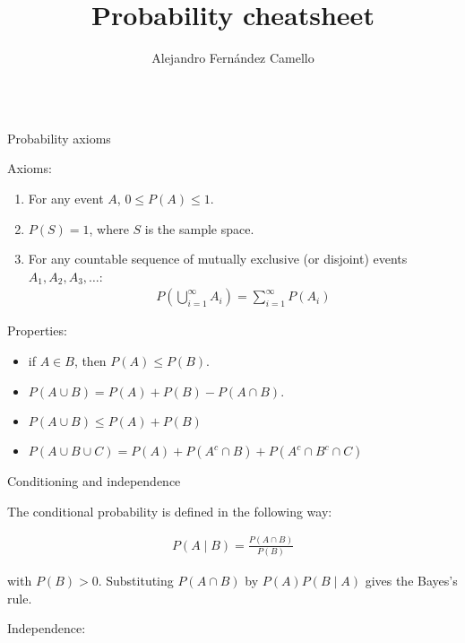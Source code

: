 \documentclass{beamer}
\title{Probability cheatsheet}
\author{Alejandro Fernández Camello}
\date{}
\begin{document}
\begin{frame}

\maketitle

\begin{columns}

\begin{column}{0.3\textwidth}
\begin{block}{Probability axioms}

Axioms:

\begin{enumerate}
    \item For any event $A$, $0 \leq P(A) \leq 1$.
    \item $P(S) = 1$, where $S$ is the sample space.
    \item For any countable sequence of mutually exclusive (or disjoint) events $A_1, A_2, A_3, \ldots$:
    \begin{align*}
        P\left( \bigcup_{i=1}^{\infty} A_i \right) = \sum_{i=1}^{\infty} P(A_i)
    \end{align*}
\end{enumerate}

Properties:

\begin{itemize}
    \item if $A \in B$, then $P(A) \leq P(B)$.
    \item $P(A \cup B) = P(A) + P(B) - P(A \cap B)$.
    \item $P(A \cup B) \leq P(A) + P(B)$
    \item $P(A \cup B \cup C) = P(A) + P(A^c \cap B) + P(A^c \cap B^c \cap C)$
\end{itemize}

\end{block}

\begin{block}{Conditioning and independence}

The conditional probability is defined in the following way:

\begin{align*}
    P(A \mid B) = \frac{P(A \cap B)}{P(B)}
\end{align*}

with $P(B) > 0$. Substituting $P(A \cap B)$ by $P(A)P(B \mid A)$ gives the Bayes's rule.

Independence:


\end{block}
\end{column}
\end{columns}
\end{frame}
\end{document}
